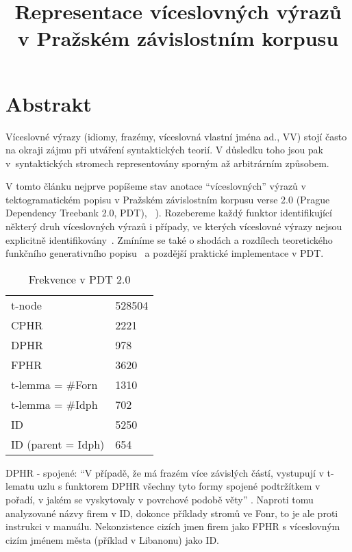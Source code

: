 \documentclass[12pt]{article}
\title{Representace víceslovných výrazů\\ v Pražském závislostním korpusu}
\date{}                                           %
\begin{document}
\maketitle
\thispagestyle{empty} %

\csprimeson %
\section*{Abstrakt}
Víceslovné výrazy (idiomy, frazémy, víceslovná vlastní jména ad., VV) stojí často na okraji zájmu při utváření syntaktických teorií. V důsledku toho jsou pak v~syntaktických stromech representovány sporným až arbitrárním způsobem.

V tomto článku nejprve popíšeme stav anotace ``víceslovných'' výrazů v tektogramatickém popisu v Pražském závislostním korpusu verse 2.0 (Prague Dependency Treebank 2.0, PDT), ~\citep{hajic:2005}). Rozebereme každý funktor identifikující některý druh víceslovných výrazů i případy, ve kterých víceslovné výrazy nejsou explicitně identifikovány~\citep{mikulova:2006}. Zmíníme se také o shodách a rozdílech teoretického funkčního generativního popisu~\citep{sgall-etal:1986} a pozdější praktické implementace v PDT.
\begin{table}[htdp]
\begin{center}
\begin{tabular}{|l|l|}
\hline
t-node & 528504 \\
CPHR & 2221\\
DPHR & 978 \\
FPHR & 3620 \\
t-lemma = \#Forn & 1310 \\
t-lemma = \#Idph & 702 \\
ID & 5250 \\
ID (parent = Idph) & 654 \\
\hline
\end{tabular}
\caption{Frekvence v PDT 2.0}
\end{center}
\label{default}
\end{table}%

DPHR - spojené: ``V případě, že má frazém více závislých částí, vystupují v t-lematu uzlu s funktorem DPHR všechny tyto formy spojené podtržítkem v pořadí, v jakém se vyskytovaly v povrchové podobě věty'' \citep{mikulova:2006}. Naproti tomu analyzované názvy firem v ID, dokonce příklady stromů ve Fonr, to je ale proti instrukci v manuálu. Nekonzistence cizích jmen firem jako FPHR  s víceslovným cizím jménem města (příklad v Libanonu) jako ID.
\end{document}
